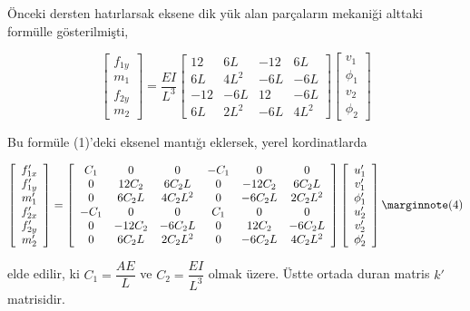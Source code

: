 \documentclass[12pt,fleqn]{article}\usepackage{../../common}
\begin{document}
Önceki dersten hatırlarsak eksene dik yük alan parçaların mekaniği alttaki
formülle gösterilmişti,

$$
\left[\begin{array}{c}
f_{1y} \\ m_1 \\ f_{2y} \\ m_2
\end{array}\right] =
\frac{EI}{L^3}
\left[\begin{array}{cccc}
12 & 6L & -12 & 6L \\
6L & 4L^2 & -6L & -6L \\
-12 & -6L & 12 & -6L \\
6L & 2L^2 & -6L & 4L^2
\end{array}\right]
\left[\begin{array}{ccc}
v_1 \\ \phi_1 \\ v_2 \\ \phi_2
\end{array}\right]
$$

Bu formüle (1)'deki eksenel mantığı eklersek, yerel kordinatlarda

$$
\left[\begin{array}{c}
f'_{1x} \\ f'_{1y} \\ m'_1 \\ f'_{2x} \\ f'_{2y} \\ m'_2
\end{array}\right] =
\left[\begin{array}{cccccc}
C_1 & 0 & 0 & -C_1 & 0 & 0 \\
0 & 12C_2 & 6 C_2 L & 0 & -12 C_2 & 6 C_2 L \\
0 & 6C_2 L & 4 C_2 L^2 & 0 & -6 C_2 L & 2 C_2 L^2 \\
-C_1 & 0 & 0 & C_1 & 0 & 0 \\
0 & -12C_2 & -6 C_2 L & 0 & 12 C_2 & -6 C_2 L \\
0 & 6 C_2 L & 2 C_2 L^2 & 0 & -6C_2 L & 4C_2 L^2
\end{array}\right]
\left[\begin{array}{c}
u'_1 \\ v'_1 \\ \phi'_1 \\ u'_2 \\ v'_2 \\ \phi'_2
\end{array}\right]
\mlabel{4}
$$

elde edilir, ki $C_1 = \dfrac{AE}{L}$ ve $C_2 = \dfrac{EI}{L^3}$
olmak üzere. Üstte ortada duran matris $k'$ matrisidir.
\end{document}
